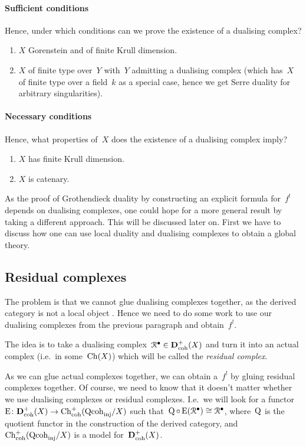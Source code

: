 \paragraph{Sufficient conditions}
Hence, under which conditions can we prove the existence of a dualising complex?
\begin{enumerate}
  \item $X$ Gorenstein and of finite Krull dimension.
  \item $X$ of finite type over~$Y$ with~$Y$ admitting a dualising complex (which has~$X$ of finite type over a field~$k$ as a special case, hence we get Serre duality for arbitrary singularities).
\end{enumerate}
\paragraph{Necessary conditions}
Hence, what properties of~$X$ does the existence of a dualising complex imply?
\begin{enumerate}
  \item $X$ has finite Krull dimension.
  \item $X$ is catenary.
\end{enumerate}
As the proof of Grothendieck duality by constructing an explicit formula for~$f^!$ depends on dualising complexes, one could hope for a more general result by taking a different approach. This will be discussed later on. First we have to discuss how one can use local duality and dualising complexes to obtain a global theory.

\subsection{Residual complexes}
\label{subsection:residual-complexes}
The problem is that we cannot glue dualising complexes together, as the derived category is not a local object \cite[page 193]{hartshorne-residues-and-duality}. Hence we need to do some work to use our dualising complexes from the previous paragraph and obtain~$f^!$.

The idea is to take a dualising complex~$\mathcal{R}^\bullet\in\mathbf{D}_{\mathrm{coh}}^+(X)$ and turn it into an actual complex (i.e.\ in some~$\operatorname{Ch}(X)$) which will be called the \emph{residual complex}.

As we can glue actual complexes together, we can obtain a~$f^!$ by gluing residual complexes together. Of course, we need to know that it doesn't matter whether we use dualising complexes or residual complexes. I.e.\ we will look for a functor~$\operatorname{E}\colon\mathbf{D}_{\mathrm{coh}}^+(X)\to\operatorname{Ch}_{\mathrm{coh}}^+(\mathrm{Qcoh}_{\mathrm{inj}}/X)$ such that~$\operatorname{Q}\circ\operatorname{E}(\mathcal{R}^\bullet)\cong\mathcal{R}^\bullet$, where~$\operatorname{Q}$ is the quotient functor in the construction of the derived category, and~$\operatorname{Ch}_{\mathrm{coh}}^+(\mathrm{Qcoh}_{\mathrm{inj}}/X)$ is a model for~$\mathbf{D}_{\mathrm{coh}}^+(X)$.

